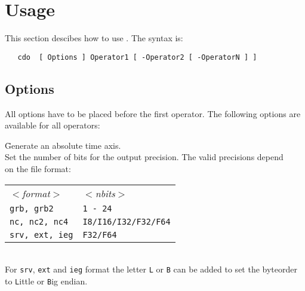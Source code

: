 \section{Usage}

This section descibes how to use {\CDO}.
The syntax is:
\begin{verbatim}
   cdo  [ Options ] Operator1 [ -Operator2 [ -OperatorN ] ]
\end{verbatim}


\subsection{Options}

All options have to be placed before the first operator.
The following options are available for all operators:

\begin{tabbing}
         \= Generate an absolute time axis. \\
         \> Set the number of bits for the output precision. The valid precisions depend \\
         \> on the file format:\\
         \> \parbox[r]{3in}{
              \vspace*{1mm}
              \hspace*{0cm}\begin{tabular}{|l|l|}
              \hline
              \rowcolor[gray]{.9}
                \sl $<$format$>$ & \sl $<$nbits$>$ \\
                {\tt grb, grb2}     & {\tt 1 - 24} \\
                {\tt nc, nc2, nc4}  & {\tt I8/I16/I32/F32/F64}   \\
                {\tt srv, ext, ieg} & {\tt F32/F64}   \\
              \hline
              \end{tabular}
              \vspace*{1mm}
            } \\
         \> For {\tt srv}, {\tt ext} and {\tt ieg} format the letter {\tt L} or {\tt B} can be added to set the byteorder \\
         \> to {\tt L}ittle or {\tt B}ig endian. \\

\end{tabbing}
